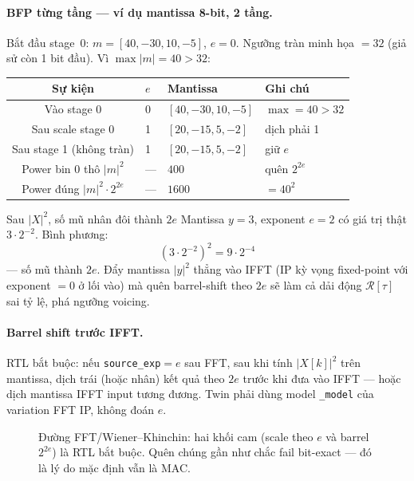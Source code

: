 \paragraph{BFP từng tầng --- ví dụ mantissa 8-bit, 2 tầng.}
Bắt đầu stage~0: $m = [40,-30,10,-5]$, $e = 0$. Ngưỡng tràn minh họa $= 32$ (giả sử còn 1 bit đầu). Vì $\max|m| = 40 > 32$:
\begin{center}\small
\begin{tabular}{@{}clll@{}}\toprule
Sự kiện & $e$ & Mantissa & Ghi chú \\
\midrule
Vào stage 0 & 0 & $[40,-30,10,-5]$ & $\max=40>32$ \\
Sau scale stage 0 & 1 & $[20,-15,5,-2]$ & dịch phải 1 \\
Sau stage 1 (không tràn) & 1 & $[20,-15,5,-2]$ & giữ $e$ \\
Power bin 0 thô $|m|^2$ & --- & $400$ & quên $2^{2e}$ \\
Power đúng $|m|^2\cdot 2^{2e}$ & --- & $1600$ & $=40^2$ \\
\bottomrule
\end{tabular}
\end{center}

\begin{firstprin}{Sau $|X|^2$, số mũ nhân đôi thành $2e$}
Mantissa $y = 3$, exponent $e = 2$ có giá trị thật $3\cdot 2^{-2}$. Bình phương:
\[
(3\cdot 2^{-2})^2 = 9\cdot 2^{-4}
\]
--- số mũ thành $2e$. Đẩy mantissa $|y|^2$ thẳng vào IFFT (IP kỳ vọng fixed-point với exponent $=0$ ở lối vào) mà quên barrel-shift theo $2e$ sẽ làm cả dải động $\mathcal{R}[\tau]$ sai tỷ lệ, phá ngưỡng voicing.
\end{firstprin}

\paragraph{Barrel shift trước IFFT.}
RTL bắt buộc: nếu \texttt{source\_exp}$=e$ sau FFT, sau khi tính $|X[k]|^2$ trên mantissa, dịch trái (hoặc nhân) kết quả theo $2e$ trước khi đưa vào IFFT --- hoặc dịch mantissa IFFT input tương đương. Twin phải dùng model \texttt{\_model} của variation FFT IP, không đoán $e$.

\begin{figure}[H]
\centering
{}
\caption{Đường FFT/Wiener--Khinchin: hai khối cam (scale theo $e$ và barrel $2^{2e}$) là RTL bắt buộc. Quên chúng gần như chắc fail bit-exact --- đó là lý do mặc định vẫn là MAC.}
\label{fig:ch07_fft_bfp}
\end{figure}

